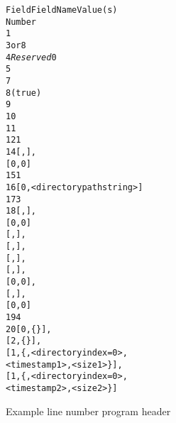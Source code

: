 \begin{figure}[h]
\begin{dwflisting}
\begin{alltt}
  Field           Field Name                      Value(s)
  Number
     1        
     3     or 8
     4    \textit{Reserved}                      0
     5        
     7    
     8     (true)
     9    
    10    
    11    
    12        \HFNdirectoryformatcount{}        1
    14    \HFNdirectoryformattable{}        [\DWLNCTpath, \DWFORMstring], 
	                                        [0, 0]
    15    \HFNdirectoriescount{}             1
    16    \HFNdirectories{}                   [0, <directory path string>]
    17    \HFNfilenameformatcount{}        3
    18    \HFNfilenameformattable{}        [\DWLNCTsource, \DWFORMstrp],
                                        [0, 0]
                                        [\DWLNCTpath, \DWFORMstring],
                                        [\DWLNCTdirectoryindex, \DWFORMudata],
                                        [\DWLNCTtimestamp, \DWFORMudata],
                                        [\DWLNCTsize, \DWFORMudata],
                                        [0, 0],
                                        [\DWLNCTURL, \DWFORMstrp],
                                        [0, 0]
    19    \HFNfilenamescount{}              4
    20    \HFNfilenames{}                    [0, \{<source string offset>\}],
                                        [2, \{<URL string offset>\}],
                                        [1, \{<name string 1>, <directory index=0>, 
                                             <timestamp 1>, <size 1>\}],
                                        [1, \{<name string 2>, <directory index=0>, 
                                             <timestamp 2>, <size 2>\}]
\end{alltt}
\end{dwflisting}
\begin{centering}
\caption{Example line number program header}
\label{fig:V5LNCTusingV6}
\end{centering}
\end{figure}


